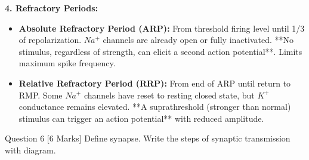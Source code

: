 \documentclass[11pt,a4paper]{article}
\begin{document}
\begin{ansbox}
\textbf{4. Refractory Periods:}
\begin{itemize}[leftmargin=*]
    \item \textbf{Absolute Refractory Period (ARP):} From threshold firing level until 1/3 of repolarization. $Na^+$ channels are already open or fully inactivated. **No stimulus, regardless of strength, can elicit a second action potential**. Limits maximum spike frequency.
    \item \textbf{Relative Refractory Period (RRP):} From end of ARP until return to RMP. Some $Na^+$ channels have reset to resting closed state, but $K^+$ conductance remains elevated. **A suprathreshold (stronger than normal) stimulus can trigger an action potential** with reduced amplitude.
\end{itemize}
\end{ansbox}

\begin{qbox}{Question 6 [6 Marks]}
Define synapse. Write the steps of synaptic transmission with diagram.
\end{qbox}
\end{document}
